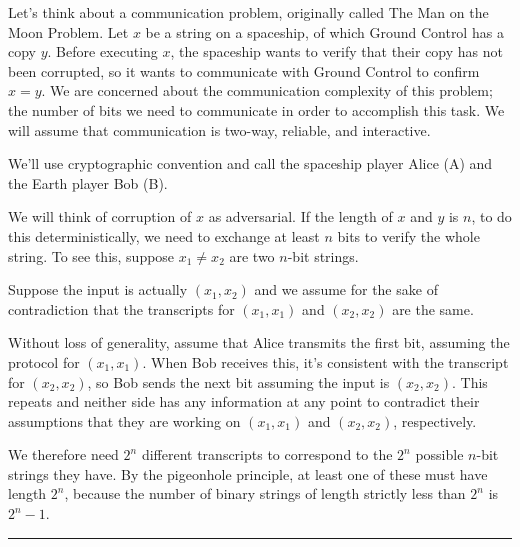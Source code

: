 \documentclass[twoside]{article}
\newenvironment{proof}{{\bf Proof:}}{\hfill\rule{2mm}{2mm}}
\begin{document}
Let's think about a communication problem, originally called The Man on the Moon Problem.  Let $x$ be a string on a spaceship, of which Ground Control has a copy $y$.  Before executing $x$, the spaceship wants to verify that their copy has not been corrupted, so it wants to communicate with Ground Control to confirm $x=y$.  We are concerned about the communication complexity of this problem; the number of bits we need to communicate in order to accomplish this task.  We will assume that communication is two-way, reliable, and interactive.

We'll use cryptographic convention and call the spaceship player Alice (A) and the Earth player Bob (B).

We will think of corruption of $x$ as adversarial.  If the length of $x$ and $y$ is $n$, to do this deterministically, we need to exchange at least $n$ bits to verify the whole string.  To see this, suppose $x_1\neq x_2$ are two $n$-bit strings.  


\begin{proof}
	
	Suppose the input is actually $(x_1,x_2)$ and we assume for the sake of contradiction that the transcripts for $(x_1,x_1)$ and $(x_2,x_2)$ are the same.
	
	Without loss of generality, assume that Alice transmits the first bit, assuming the protocol for $(x_1,x_1)$.  When Bob receives this, it's consistent with the transcript for $(x_2,x_2)$, so Bob sends the next bit assuming the input is $(x_2,x_2)$.  This repeats and neither side has any information at any point to contradict their assumptions that they are working on $(x_1,x_1)$ and $(x_2,x_2)$, respectively.
	
	We therefore need $2^n$ different transcripts to correspond to the $2^n$ possible $n$-bit strings they have.  By the pigeonhole principle, at least one of these must have length $2^n$, because the number of binary strings of length strictly less than $2^n$ is $2^n -1$.
	
	
	
\end{proof}
\end{document}
